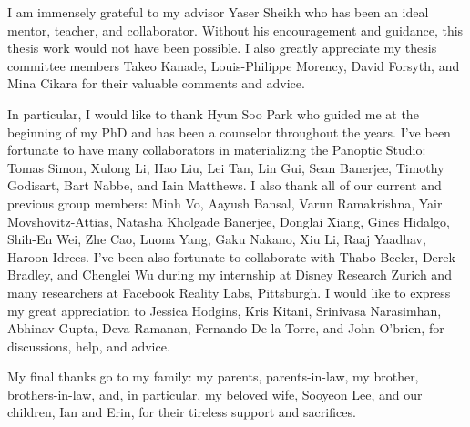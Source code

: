 \begin{acknowledgements}
I am immensely grateful to my advisor Yaser Sheikh who has been an ideal mentor, teacher, and collaborator. Without his encouragement and guidance, this thesis work would not have been possible. I also greatly appreciate my thesis committee members Takeo Kanade,  Louis-Philippe Morency, David Forsyth, and Mina Cikara for their valuable comments and advice.

In particular, I would like to thank Hyun Soo Park who guided me at the beginning of my PhD and has been a counselor throughout the years. I've been fortunate to have many collaborators in materializing the Panoptic Studio: Tomas Simon, Xulong Li, Hao Liu, Lei Tan, Lin Gui, Sean Banerjee, Timothy Godisart, Bart Nabbe, and Iain Matthews. I also thank all of our current and previous group members: Minh Vo, Aayush Bansal, Varun Ramakrishna, Yair Movshovitz-Attias, Natasha Kholgade Banerjee, Donglai Xiang, Gines Hidalgo, Shih-En Wei, Zhe Cao, Luona Yang, Gaku Nakano, Xiu Li, Raaj Yaadhav, Haroon Idrees. I've been also fortunate to collaborate with Thabo Beeler, Derek Bradley, and Chenglei Wu during my internship at Disney Research Zurich and many researchers at Facebook Reality Labs, Pittsburgh. I would like to express my great appreciation to Jessica Hodgins, Kris Kitani, Srinivasa Narasimhan, Abhinav Gupta, Deva Ramanan, Fernando De la Torre, and John O’brien, for discussions, help, and advice.

My final thanks go to my family: my parents, parents-in-law, my brother, brothers-in-law, and, in particular, my beloved wife, Sooyeon Lee, and our children, Ian and Erin, for their tireless support and sacrifices. 
\end{acknowledgements}